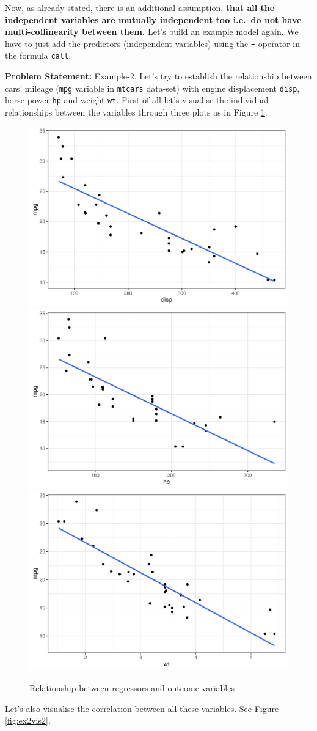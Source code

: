 \documentclass[
]{book}
\begin{document}
Now, as already stated, there is an additional assumption, \textbf{that all the independent variables are mutually independent too i.e.~do not have multi-collinearity between them.} Let's build an example model again. We have to just add the predictors (independent variables) using the \texttt{+} operator in the formula \texttt{call}.

\textbf{Problem Statement:} Example-2. Let's try to establish the relationship between cars' mileage (\texttt{mpg} variable in \texttt{mtcars} data-set) with engine displacement \texttt{disp}, horse power \texttt{hp} and weight \texttt{wt}. First of all let's visualise the individual relationships between the variables through three plots as in Figure \ref{fig:ex2vis}.

\begin{figure}

{\centering \includegraphics[width=0.31\linewidth]{DauR_files/figure-latex/ex2vis-1} \includegraphics[width=0.31\linewidth]{DauR_files/figure-latex/ex2vis-2} \includegraphics[width=0.31\linewidth]{DauR_files/figure-latex/ex2vis-3} 

}

\caption{Relationship between regressors and outcome variables}\label{fig:ex2vis}
\end{figure}

Let's also visualise the correlation between all these variables. See Figure \ref{fig:ex2vis2}.
\end{document}
